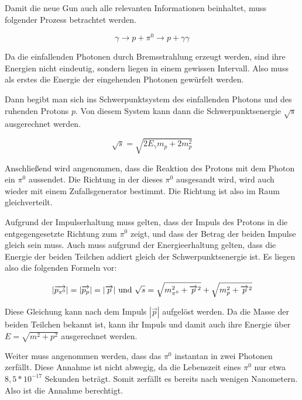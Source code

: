 \documentclass[a4paper,11pt,oneside,final,german,openbib,pdftex]{scrbook}
\begin{document}
{Damit die neue Gun auch alle relevanten Informationen beinhaltet, muss folgender Prozess betrachtet werden.

\begin{equation}
\gamma \rightarrow p + \pi^0 \rightarrow p + \gamma \gamma 
\end{equation}

Da die einfallenden Photonen durch Bremsstrahlung erzeugt werden, sind ihre Energien nicht eindeutig, sondern liegen in einem gewissen Intervall. Also muss als erstes die Energie der eingehenden Photonen gew\"urfelt werden.

Dann begibt man sich ins Schwerpunktsystem des einfallenden Photons und des ruhenden Protons $p$. 
Von diesem System kann dann die Schwerpunktsenergie $\sqrt{s}$ ausgerechnet werden.

\begin{equation}
\sqrt{s}= \sqrt{2E_{\gamma}m_p+2m_p^2}
\end{equation}

Anschlie{\ss}end wird angenommen, dass die Reaktion des Protons mit dem Photon ein $\pi^0$ aussendet. Die Richtung in der dieses $\pi^0$ ausgesandt wird, wird auch wieder mit einem Zufallsgenerator bestimmt. Die Richtung ist also im Raum gleichverteilt.

Aufgrund der Impulserhaltung muss gelten, dass der Impuls des Protons in die entgegengesetzte Richtung zum $\pi^0$ zeigt, und dass der Betrag der beiden Impulse gleich sein muss. Auch muss aufgrund der Energieerhaltung gelten, dass die Energie der beiden Teilchen addiert gleich der Schwerpunktsenergie ist. Es liegen also die folgenden Formeln vor:


\begin{equation}
|\overrightarrow{p_{\pi^0}}|=|\overrightarrow{p_p}| = |\overrightarrow{p}| \textnormal{  und  } \sqrt{s}=\sqrt{m_{\pi^0}^2+\overrightarrow{p}^2} + \sqrt{m_{p}^2+\overrightarrow{p}^2}
\end{equation}


Diese Gleichung kann nach dem Impuls $|\overrightarrow{p}|$ aufgel\"ost werden. Da die Masse der beiden Teilchen bekannt ist, kann ihr Impuls und damit auch ihre Energie über $E=\sqrt{m^2+p^2}$ ausgerechnet werden. 

Weiter muss angenommen werden, dass das $\pi^0$ instantan in zwei Photonen zerf\"allt. Diese Annahme ist nicht abwegig, da die Lebenszeit eines $\pi^0$ nur etwa $8,5 * 10^{-17}$ Sekunden betr\"agt. Somit zerf\"allt es bereits nach wenigen Nanometern. Also ist die Annahme berechtigt.

}
\end{document}

